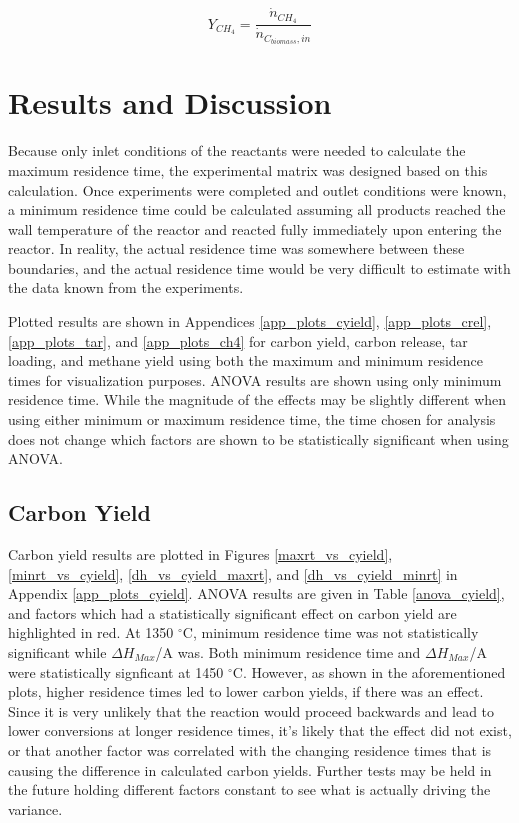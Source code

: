 \documentclass[11pt,twocolumn]{article}
\begin{document}
\begin{equation}
	Y_{CH_4} = \frac{\dot{n}_{CH_4}}{\dot{n}_{C_{biomass},in}}
	\label{eq_ch4}
\end{equation}


\section*{Results and Discussion}

Because only inlet conditions of the reactants were needed to calculate the maximum residence time, the experimental matrix was designed based on this calculation.  Once experiments were completed and outlet conditions were known, a minimum residence time could be calculated assuming all products reached the wall temperature of the reactor and reacted fully immediately upon entering the reactor.  In reality, the actual residence time  was somewhere between these boundaries, and the actual residence time would be very difficult to estimate with the data known from the experiments.  

Plotted results are shown in Appendices \ref{app_plots_cyield}, \ref{app_plots_crel}, \ref{app_plots_tar}, and \ref{app_plots_ch4} for carbon yield, carbon release, tar loading, and methane yield using both the maximum and minimum residence times for visualization purposes.  ANOVA results are shown using only minimum residence time.  While the magnitude of the effects may be slightly different when using either minimum or maximum residence time, the time chosen for analysis does not change which factors are shown to be statistically significant when using ANOVA.


\subsection*{Carbon Yield}

Carbon yield results are plotted in Figures \ref{maxrt_vs_cyield}, \ref{minrt_vs_cyield}, \ref{dh_vs_cyield_maxrt}, and \ref{dh_vs_cyield_minrt} in Appendix \ref{app_plots_cyield}.  ANOVA results are given in Table \ref{anova_cyield}, and factors which had a statistically significant effect on carbon yield are highlighted in red.  At 1350 $^\circ$C, minimum residence time was not statistically significant while $\Delta H_{Max}$/A was.  Both minimum residence time and $\Delta H_{Max}$/A were statistically signficant at 1450 $^\circ$C.  However, as shown in the aforementioned plots, higher residence times led to lower carbon yields, if there was an effect.  Since it is very unlikely that the reaction would proceed backwards and lead to lower conversions at longer residence times, it's likely that the effect did not exist, or that another factor was correlated with the changing residence times that is causing the difference in calculated carbon yields.  Further tests may be held in the future holding different factors constant to see what is actually driving the variance.
\end{document}
